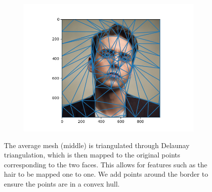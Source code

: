 \documentclass[a4paper]{article}
\begin{document}
\begin{figure}[H]
\begin{subfigure}{0.32\textwidth}
        \includegraphics[width=\textwidth]{../visuals/average_jamie_muscato_mesh.png}
    \end{subfigure}
    \caption{The average mesh (middle) is triangulated through Delaunay triangulation, which is then mapped to the original points corresponding to the two faces. This allows for features such as the hair to be mapped one to one. We add points around the border to ensure the points are in a convex hull.}
\end{figure}
\end{document}
